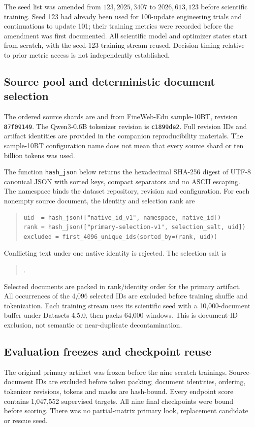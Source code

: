 \documentclass[11pt,letterpaper]{article}
\begin{document}
The seed list was amended from $123,2025,3407$ to $2026,613,123$ before
scientific training. Seed 123 had already been used for 100-update
engineering trials and continuations to update 101; their training metrics
were recorded before the amendment was first documented. All scientific
model and optimizer states start from scratch, with the seed-123 training
stream reused. Decision timing relative to prior metric access is not
independently established.

\subsection{Source pool and deterministic document selection}
\label{app:data-selection}
The ordered source shards are  and
 from FineWeb-Edu sample-10BT, revision
\texttt{87f09149}. The Qwen3-0.6B tokenizer revision is \texttt{c1899de2}.
Full revision IDs and artifact identities are provided in the companion
reproducibility materials. The sample-10BT configuration name does not mean
that every source shard or ten billion tokens was used.

The function \texttt{hash\_json} below returns the hexadecimal SHA-256 digest
of UTF-8 canonical JSON with sorted keys, compact separators and no ASCII
escaping. The namespace binds the dataset repository,
revision and configuration. For each nonempty source document, the identity
and selection rank are
\begin{quote}\small
\begin{verbatim}
uid  = hash_json(["native_id_v1", namespace, native_id])
rank = hash_json(["primary-selection-v1", selection_salt, uid])
excluded = first_4096_unique_ids(sorted_by=(rank, uid))
\end{verbatim}
\end{quote}
Conflicting text under one native identity is rejected. The selection salt is
\begin{quote}\small
{}.
\end{quote}
Selected documents are packed
in rank/identity order for the primary artifact. All occurrences of the
4,096 selected IDs are excluded before training shuffle and tokenization.
Each training stream uses its scientific seed with a 10,000-document buffer
under Datasets 4.5.0, then packs 64,000 windows. This is document-ID exclusion,
not semantic or near-duplicate decontamination.

\subsection{Evaluation freezes and checkpoint reuse}
The original primary artifact was frozen before the nine scratch trainings.
Source-document IDs are excluded before token packing; document identities,
ordering, tokenizer revisions, tokens and masks are hash-bound.
Every endpoint score contains 1,047,552 supervised targets.
All nine final checkpoints were bound before scoring. There was no
partial-matrix primary look, replacement candidate or rescue seed.
\end{document}
